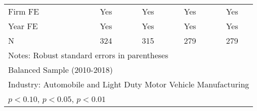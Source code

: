 \begin{table}[htbp]
\begin{tabular}{l*{4}{c}}
\midrule
Firm FE             &         Yes         &         Yes         &         Yes         &         Yes         \\
Year FE             &         Yes         &         Yes         &         Yes         &         Yes         \\
N                   &         324         &         315         &         279         &         279         \\
\bottomrule
\multicolumn{5}{l}{\footnotesize Notes: Robust standard errors in parentheses}\\
\multicolumn{5}{l}{\footnotesize Balanced Sample (2010-2018)}\\
\multicolumn{5}{l}{\footnotesize Industry: Automobile and Light Duty Motor Vehicle Manufacturing}\\
\multicolumn{5}{l}{\footnotesize \sym{*} \(p<0.10\), \sym{**} \(p<0.05\), \sym{***} \(p<0.01\)}\\
\end{tabular}
\end{table}

